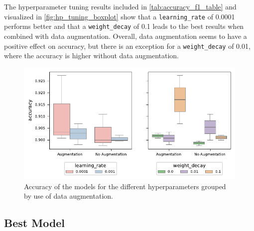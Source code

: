 The hyperparameter tuning results included in \autoref{tab:accuracy_f1_table} and
visualized in \autoref{fig:hp_tuning_boxplot} show that a \texttt{learning\_rate} of 0.0001
performs better and that a \texttt{weight\_decay} of 0.1 leads to the best results when
combined with data augmentation. Overall, data augmentation seems to have a positive
effect on accuracy, but there is an exception for a \texttt{weight\_decay} of 0.01,
where the accuracy is higher without data augmentation.

\begin{figure}[H]
    \centering
    \captionsetup{width=0.8\linewidth}
    \includegraphics{figures/hp_tuning_boxplot.pdf}
    \caption{Accuracy of the models for the different hyperparameters grouped by use of data augmentation.}
    \label{fig:hp_tuning_boxplot}
\end{figure}

\subsection{Best Model}%

